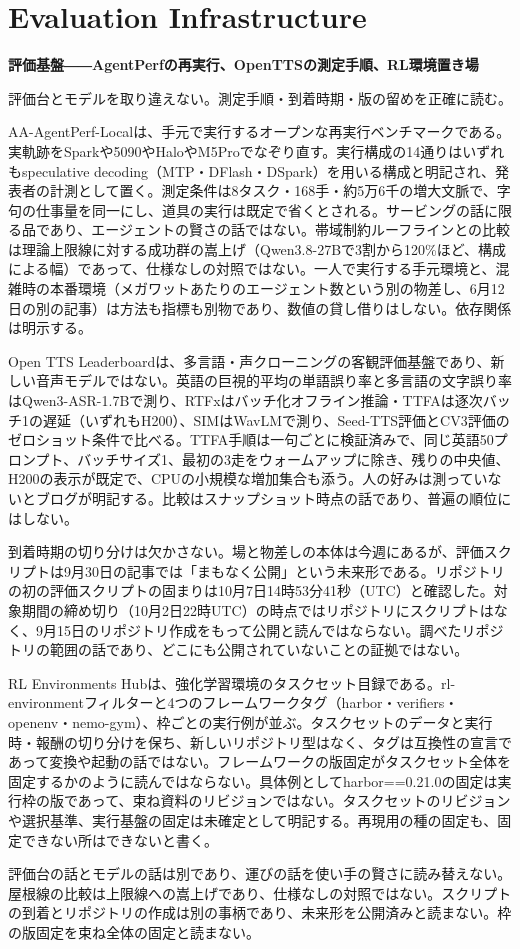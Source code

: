 \section{Evaluation Infrastructure}
\begin{wideflow}
{\Large\bfseries 評価基盤――AgentPerfの再実行、OpenTTSの測定手順、RL環境置き場}\par
\smallskip
{\color{SurveyMuted}評価台とモデルを取り違えない。測定手順・到着時期・版の留めを正確に読む。}\par
\end{wideflow}

AA-AgentPerf-Localは、手元で実行するオープンな再実行ベンチマークである\cite{agentperf}。実軌跡をSparkや5090やHaloやM5Proでなぞり直す。実行構成の14通りはいずれもspeculative decoding（MTP・DFlash・DSpark）を用いる構成と明記され、発表者の計測として置く。測定条件は8タスク・168手・約5万6千の増大文脈で、字句の仕事量を同一にし、道具の実行は既定で省くとされる。サービングの話に限る品であり、エージェントの賢さの話ではない。帯域制約ルーフラインとの比較は理論上限線に対する成功群の嵩上げ（Qwen3.8-27Bで3割から120\%ほど、構成による幅）であって、仕様なしの対照ではない。一人で実行する手元環境と、混雑時の本番環境（メガワットあたりのエージェント数という別の物差し、6月12日の別の記事）は方法も指標も別物であり、数値の貸し借りはしない。依存関係は明示する。

Open TTS Leaderboardは、多言語・声クローニングの客観評価基盤であり、新しい音声モデルではない\cite{opentts}。英語の巨視的平均の単語誤り率と多言語の文字誤り率はQwen3-ASR-1.7Bで測り、RTFxはバッチ化オフライン推論・TTFAは逐次バッチ1の遅延（いずれもH200）、SIMはWavLMで測り、Seed-TTS評価とCV3評価のゼロショット条件で比べる。TTFA手順は一句ごとに検証済みで、同じ英語50プロンプト、バッチサイズ1、最初の3走をウォームアップに除き、残りの中央値、H200の表示が既定で、CPUの小規模な増加集合も添う。人の好みは測っていないとブログが明記する。比較はスナップショット時点の話であり、普遍の順位にはしない。

到着時期の切り分けは欠かさない。場と物差しの本体は今週にあるが、評価スクリプトは9月30日の記事では「まもなく公開」という未来形である。リポジトリの初の評価スクリプトの固まりは10月7日14時53分41秒（UTC）と確認した。対象期間の締め切り（10月2日22時UTC）の時点ではリポジトリにスクリプトはなく、9月15日のリポジトリ作成をもって公開と読んではならない。調べたリポジトリの範囲の話であり、どこにも公開されていないことの証拠ではない。

RL Environments Hubは、強化学習環境のタスクセット目録である\cite{rlenv}。rl-environmentフィルターと4つのフレームワークタグ（harbor・verifiers・openenv・nemo-gym）、枠ごとの実行例が並ぶ。タスクセットのデータと実行時・報酬の切り分けを保ち、新しいリポジトリ型はなく、タグは互換性の宣言であって変換や起動の話ではない。フレームワークの版固定がタスクセット全体を固定するかのように読んではならない。具体例としてharbor==0.21.0の固定は実行枠の版であって、束ね資料のリビジョンではない。タスクセットのリビジョンや選択基準、実行基盤の固定は未確定として明記する。再現用の種の固定も、固定できない所はできないと書く。

\begin{claimboundary}[資料と評価の境界]
評価台の話とモデルの話は別であり、運びの話を使い手の賢さに読み替えない。屋根線の比較は上限線への嵩上げであり、仕様なしの対照ではない。スクリプトの到着とリポジトリの作成は別の事柄であり、未来形を公開済みと読まない。枠の版固定を束ね全体の固定と読まない。
\end{claimboundary}
